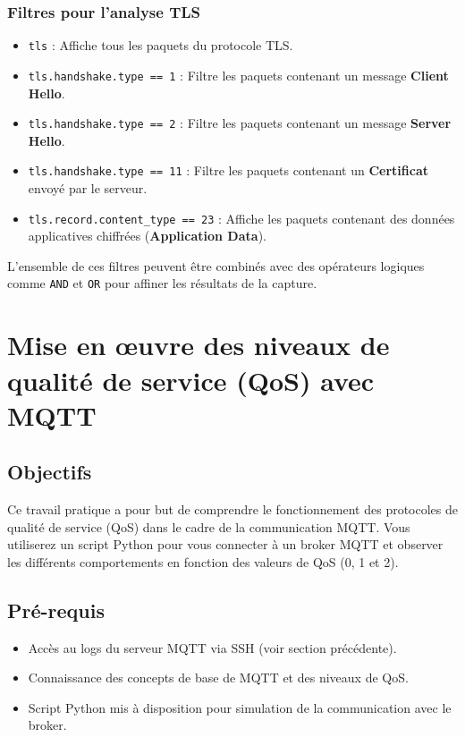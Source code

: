 \documentclass{article}
\begin{document}
\subsubsection{Filtres pour l'analyse TLS}
\begin{itemize}
    \item \texttt{tls} : Affiche tous les paquets du protocole TLS.
    \item \texttt{tls.handshake.type == 1} : Filtre les paquets contenant un message \textbf{Client Hello}.
    \item \texttt{tls.handshake.type == 2} : Filtre les paquets contenant un message \textbf{Server Hello}.
    \item \texttt{tls.handshake.type == 11} : Filtre les paquets contenant un \textbf{Certificat} envoyé par le serveur.
    \item \texttt{tls.record.content\_type == 23} : Affiche les paquets contenant des données applicatives chiffrées (\textbf{Application Data}).
\end{itemize}


L'ensemble de ces filtres peuvent être combinés avec des opérateurs logiques comme \texttt{AND} et \texttt{OR} pour affiner les résultats de la capture.

\section{Mise en œuvre des niveaux de qualité de service (QoS) avec MQTT}

\subsection{Objectifs}

Ce travail pratique a pour but de comprendre le fonctionnement des protocoles de qualité de service (QoS) dans le cadre de la communication MQTT. Vous utiliserez un script Python pour vous connecter à un broker MQTT et observer les différents comportements en fonction des valeurs de QoS (0, 1 et 2). 

\subsection{Pré-requis}

\begin{itemize}
    \item Accès au logs du serveur MQTT via SSH (voir section précédente).
    \item Connaissance des concepts de base de MQTT et des niveaux de QoS.
    \item Script Python mis à disposition pour simulation de la communication avec le broker.
\end{itemize}
\end{document}
